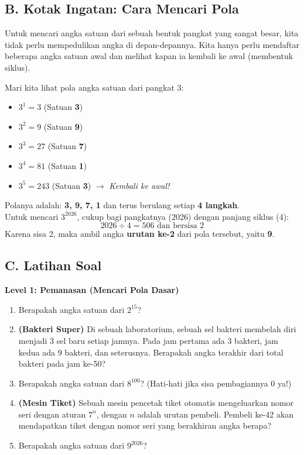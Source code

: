 \documentclass[11pt,a4paper]{article}
\begin{document}
\subsection*{B. Kotak Ingatan: Cara Mencari Pola}
\begin{tcolorbox}
Untuk mencari angka satuan dari sebuah bentuk pangkat yang sangat besar, kita tidak perlu mempedulikan angka di depan-depannya. Kita hanya perlu mendaftar beberapa angka satuan awal dan melihat kapan ia kembali ke awal (membentuk siklus).

Mari kita lihat pola angka satuan dari pangkat 3:
\begin{itemize}
    \item $3^1 = 3$ \quad (Satuan \textbf{3})
    \item $3^2 = 9$ \quad (Satuan \textbf{9})
    \item $3^3 = 27$ \quad (Satuan \textbf{7})
    \item $3^4 = 81$ \quad (Satuan \textbf{1})
    \item $3^5 = 243$ \quad (Satuan \textbf{3}) $\rightarrow$ \textit{Kembali ke awal!}
\end{itemize}
Polanya adalah: \textbf{3, 9, 7, 1} dan terus berulang setiap \textbf{4 langkah}.\\
Untuk mencari $3^{2026}$, cukup bagi pangkatnya (2026) dengan panjang siklus (4):
\[2026 \div 4 = 506 \text{ dan bersisa } 2\]
Karena sisa 2, maka ambil angka \textbf{urutan ke-2} dari pola tersebut, yaitu \textbf{9}.
\end{tcolorbox}

\subsection*{C. Latihan Soal}

\textbf{Level 1: Pemanasan (Mencari Pola Dasar)}
\begin{enumerate}
    \item Berapakah angka satuan dari $2^{15}$?
    \item \textbf{(Bakteri Super)} Di sebuah laboratorium, sebuah sel bakteri membelah diri menjadi 3 sel baru setiap jamnya. Pada jam pertama ada 3 bakteri, jam kedua ada 9 bakteri, dan seterusnya. Berapakah angka terakhir dari total bakteri pada jam ke-50?
    \item Berapakah angka satuan dari $8^{100}$? (Hati-hati jika sisa pembagiannya 0 ya!)
    \item \textbf{(Mesin Tiket)} Sebuah mesin pencetak tiket otomatis mengeluarkan nomor seri dengan aturan $7^n$, dengan $n$ adalah urutan pembeli. Pembeli ke-42 akan mendapatkan tiket dengan nomor seri yang berakhiran angka berapa?
    \item Berapakah angka satuan dari $9^{2026}$?
\end{enumerate}
\end{document}
